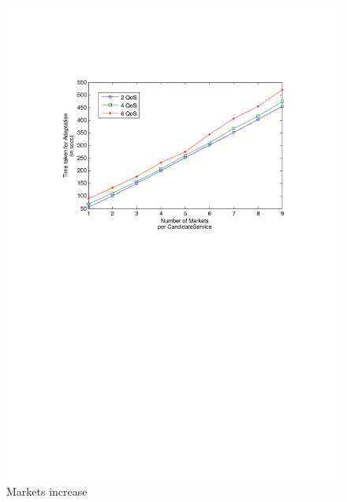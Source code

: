 \documentclass[10pt,journal,compsoc]{IEEEtran}
\begin{document}
\begin{figure}
  \centering
  \includegraphics[clip, trim=0cm 16cm 2cm 4cm, scale=0.4]{graphs/2_4_6_qos_per_mkt_scaling.pdf}
  \caption{Markets increase \label{fig:qos_per_mkt}}
\end{figure}
\end{document}
